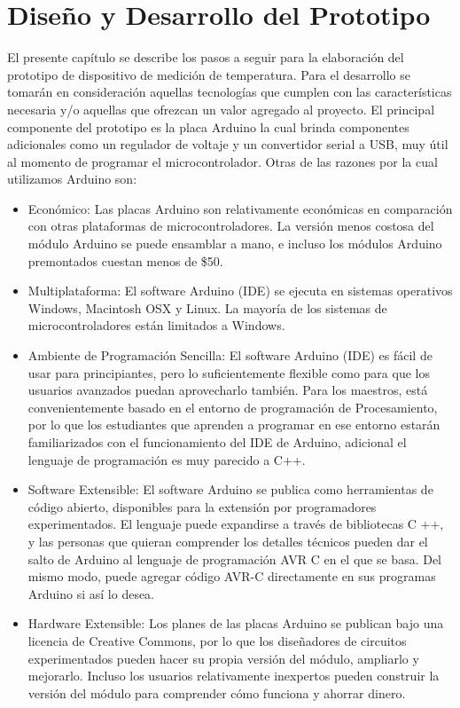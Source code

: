 \chapter{Diseño y Desarrollo del Prototipo}
\par 
El presente capítulo se describe los pasos a seguir para la elaboración del prototipo de dispositivo de medición de temperatura. Para el desarrollo se tomarán en consideración aquellas tecnologías que cumplen con las características necesaria y/o aquellas que ofrezcan un valor agregado al proyecto. El principal componente del prototipo es la placa Arduino la cual brinda componentes adicionales como un regulador de voltaje y un convertidor serial a USB, muy útil al momento de programar el microcontrolador. Otras de las razones por la cual utilizamos Arduino son\cite{arduino-intro}:

\begin{itemize}
	\item Económico: 
	Las placas Arduino son relativamente económicas en comparación con otras plataformas de microcontroladores. La versión menos costosa del módulo Arduino se puede ensamblar a mano, e incluso los módulos Arduino premontados cuestan menos de \$50.
	
	\item Multiplataforma: El software Arduino (IDE) se ejecuta en sistemas operativos Windows, Macintosh OSX y Linux. La mayoría de los sistemas de microcontroladores están limitados a Windows.
	
	\item Ambiente de Programación Sencilla: El software Arduino (IDE) es fácil de usar para principiantes, pero lo suficientemente flexible como para que los usuarios avanzados puedan aprovecharlo también. Para los maestros, está convenientemente basado en el entorno de programación de Procesamiento, por lo que los estudiantes que aprenden a programar en ese entorno estarán familiarizados con el funcionamiento del IDE de Arduino, adicional el lenguaje de programación es muy parecido a C++.
	
	\item Software Extensible: El software Arduino se publica como herramientas de código abierto, disponibles para la extensión por programadores experimentados. El lenguaje puede expandirse a través de bibliotecas C ++, y las personas que quieran comprender los detalles técnicos pueden dar el salto de Arduino al lenguaje de programación AVR C en el que se basa. Del mismo modo, puede agregar código AVR-C directamente en sus programas Arduino si así lo desea.
	
	\item Hardware Extensible: 
	Los planes de las placas Arduino se publican bajo una licencia de Creative Commons, por lo que los diseñadores de circuitos experimentados pueden hacer su propia versión del módulo, ampliarlo y mejorarlo. Incluso los usuarios relativamente inexpertos pueden construir la versión del módulo para comprender cómo funciona y ahorrar dinero.
\end{itemize}

